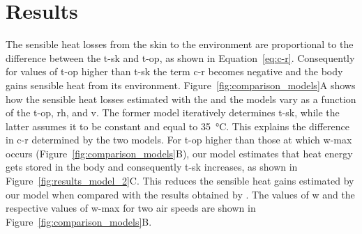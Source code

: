 

\section{Results}\label{sec:results}

The sensible heat losses from the skin to the environment are proportional to the difference between the \ac{t-sk} and \ac{t-op}, as shown in Equation~\ref{eq:c-r}.
Consequently for values of \ac{t-op} higher than \ac{t-sk} the term \ac{c-r} becomes negative and the body gains sensible heat from its environment.
Figure~\ref{fig:comparison_models}A shows how the sensible heat losses estimated with the  and the  models vary as a function of the \ac{t-op}, \ac{rh}, and \ac{v}.
The former model iteratively determines \ac{t-sk}, while the latter assumes it to be constant and equal to 35~°C.
This explains the difference in \ac{c-r} determined by the two models.
For \ac{t-op} higher than those at which \ac{w-max} occurs (Figure~\ref{fig:comparison_models}B), our model estimates that heat energy gets stored in the body and consequently \ac{t-sk} increases, as shown in Figure~\ref{fig:results_model_2}C.
This reduces the sensible heat gains estimated by our model when compared with the results obtained by .
The values of \ac{w} and the respective values of \ac{w-max} for two air speeds are shown in Figure~\ref{fig:comparison_models}B.

